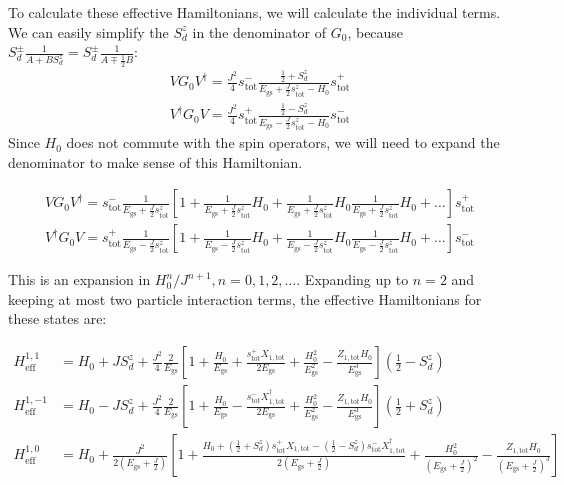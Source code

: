 \documentclass[reprint,prb,superscriptaddress]{revtex4-2}
\begin{document}
To calculate these effective Hamiltonians, we will calculate the individual terms. We can easily simplify the \(S_d^z\) in the denominator of \(G_0\), because \(S_d^\pm \frac{1}{A + B S_d^z} = S_d^\pm \frac{1}{A \mp \frac{1}{2}B}\):
\begin{align}
	V G_0 V^\dagger = \frac{J^2}{4} s_\text{tot}^- \frac{\frac{1}{2} + S_d^z}{E_\text{gs} + \frac{J}{2} s_\text{tot}^z - H_0} s_\text{tot}^+ \\
	V^\dagger G_0 V = \frac{J^2}{4} s_\text{tot}^+ \frac{\frac{1}{2} - S_d^z}{E_\text{gs} - \frac{J}{2} s_\text{tot}^z - H_0} s_\text{tot}^-
\end{align}
Since \(H_0\) does not commute with the spin operators, we will need to expand the denominator to make sense of this Hamiltonian.
\begin{widetext}
\begin{align}
	 V G_0 V^\dagger =  s_\text{tot}^- \frac{1}{E_\text{gs} + \frac{J}{2} s_\text{tot}^z}\left[1 + \frac{1}{E_\text{gs} + \frac{J}{2} s_\text{tot}^z}H_0 + \frac{1}{E_\text{gs} + \frac{J}{2} s_\text{tot}^z}H_0\frac{1}{E_\text{gs} + \frac{J}{2} s_\text{tot}^z}H_0 + \ldots\right] s_\text{tot}^+\\
	 V^\dagger G_0 V =  s_\text{tot}^+ \frac{1}{E_\text{gs} - \frac{J}{2} s_\text{tot}^z}\left[1 + \frac{1}{E_\text{gs} - \frac{J}{2} s_\text{tot}^z}H_0 + \frac{1}{E_\text{gs} - \frac{J}{2} s_\text{tot}^z}H_0\frac{1}{E_\text{gs} - \frac{J}{2} s_\text{tot}^z}H_0 + \ldots\right] s_\text{tot}^-
\end{align}
\end{widetext}
This is an expansion in \(H_0^n/J^{n+1}, n=0,1,2,\ldots\). Expanding up to \(n=2\) and keeping at most two particle interaction terms, 
the effective Hamiltonians for these states are:
\begin{widetext}
\begin{align}
	H_\text{eff}^{1, 1} &= H_0 + J S_d^z + \frac{J^2}{4}\frac{2}{E_\text{gs}}\left[1 + \frac{H_0}{E_\text{gs}} + \frac{s^+_\text{tot}X_{1,\text{tot}}}{2 E_\text{gs}} + \frac{H_0^2 }{E_\text{gs}^2} - \frac{Z_{1,\text{tot}} H_0}{E_\text{gs}^3}\right] \left(\frac{1}{2} - S_d^z\right) \\
	H_\text{eff}^{1, -1} &= H_0 - J S_d^z + \frac{J^2}{4}\frac{2}{E_\text{gs}}\left[1 + \frac{H_0}{E_\text{gs}}  - \frac{s^-_\text{tot}X^\dagger_{1,\text{tot}}}{2 E_\text{gs}}  + \frac{H_0^2}{E_\text{gs}^2}  - \frac{ Z_{1,\text{tot}} H_0}{E_\text{gs}^3}\right] \left(\frac{1}{2} + S_d^z\right) \\
	H_\text{eff}^{1, 0} &= H_0 + \frac{J^2}{2\left(E_\text{gs} + \frac{J}{2}\right)}\left[1 + \frac{ H_0 + \left(\frac{1}{2} + S_d^z\right) s^+_\text{tot}X_{1,\text{tot}} - \left(\frac{1}{2} - S_d^z\right) s^-_\text{tot}X^\dagger_{1,\text{tot}}}{2 \left(E_\text{gs} + \frac{J}{2}\right)} + \frac{H_0^2}{\left(E_\text{gs} + \frac{J}{2}\right)^2} - \frac{Z_{1,\text{tot}} H_0}{\left(E_\text{gs} + \frac{J}{2}\right)^3} \right]
\end{align}
\end{widetext}
\end{document}
